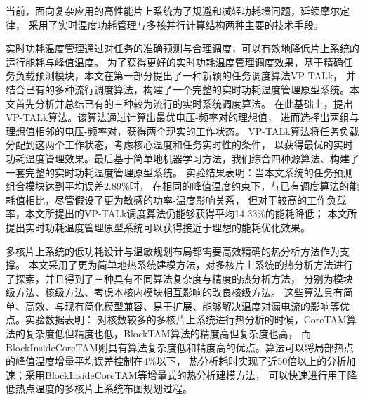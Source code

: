 

{}

\makeatother



\begin{cabstract}

当前，面向复杂应用的高性能片上系统为了规避和减轻功耗墙问题，延续摩尔定律， 采用了实时温度功耗管理与多核并行计算结构两种主要的技术手段。

实时功耗温度管理通过对任务的准确预测与合理调度，可以有效地降低片上系统的运行能耗与峰值温度。 为了获得更好的实时功耗温度管理调度效果，基于精确任务负载预测模块，本文在第一部分提出了一种新颖的任务调度算法VP-TALk， 并结合已有的多种流行调度算法，构建了一个完整的实时功耗温度管理原型系统。本文首先分析并总结已有的三种较为流行的实时系统调度算法。 在此基础上，提出VP-TALk算法。该算法通过计算出最优电压-频率对的理想值， 进而选择出两组与理想值相邻的电压-频率对，获得两个现实的工作状态。 VP-TALk算法将任务负载分配到这两个工作状态，考虑核心温度和任务实时性的条件， 以获得最优的实时功耗温度管理效果。最后基于简单地机器学习方法，我们综合四种源算法、构建了一套完整的实时功耗温度管理原型系统。 实验结果表明：当本文系统的任务预测组合模块达到平均误差2.89\%时，
在相同的峰值温度约束下，与已有调度算法的能耗值相比，尽管假设了更为敏感的功率-温度影响关系， 但对于较高的工作负载率，本文所提出的VP-TALk调度算法仍能够获得平均14.33\%的能耗降低；
本文所提出实时功耗温度管理原型系统可以获得接近于理想的能耗优化效果。

多核片上系统的低功耗设计与温敏规划布局都需要高效精确的热分析方法作为支撑。 本文采用了更为简单地热系统建模方法，对多核片上系统的热分析方法进行了探索，并且得到了三种具有不同算法复杂度与精度的热分析方法， 分别为模块级方法、核级方法、考虑本核内模块相互影响的改良核级方法。 这些算法具有简单、高效、与现有简化模型兼容、易于扩展、能够解决温度对漏电流的影响等优点。实验数据表明：
对核数较多的多核片上系统进行热分析的时候，CoreTAM算法的复杂度低但精度也低，BlockTAM算法的精度高但复杂度也高， 而BlockInsideCoreTAM则具有算法复杂度低和精度高的优点。算法可以将局部热点的峰值温度增量平均误差控制在4\%以下， 热分析耗时实现了近50倍以上的分析加速；采用BlockInsideCoreTAM等增量式的热分析建模方法， 可以快速进行用于降低热点温度的多核片上系统布图规划过程。

\end{cabstract}

